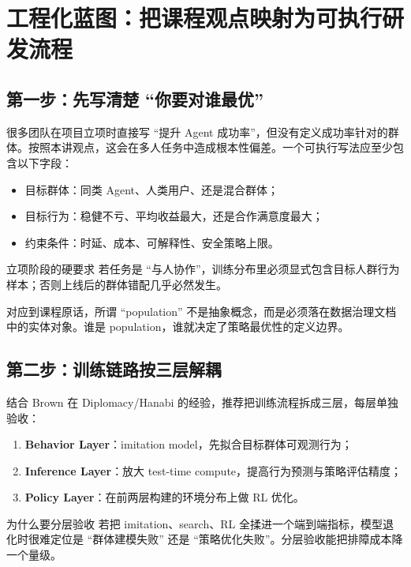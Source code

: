 \section{工程化蓝图：把课程观点映射为可执行研发流程}

\subsection{第一步：先写清楚 ``你要对谁最优''}
很多团队在项目立项时直接写 ``提升 Agent 成功率''，但没有定义成功率针对的群体。按照本讲观点，这会在多人任务中造成根本性偏差。一个可执行写法应至少包含以下字段：
\begin{itemize}
    \item 目标群体：同类 Agent、人类用户、还是混合群体；
    \item 目标行为：稳健不亏、平均收益最大，还是合作满意度最大；
    \item 约束条件：时延、成本、可解释性、安全策略上限。
\end{itemize}

\begin{importantbox}{立项阶段的硬要求}
若任务是 ``与人协作''，训练分布里必须显式包含目标人群行为样本；否则上线后的群体错配几乎必然发生。
\end{importantbox}

对应到课程原话，所谓 ``population'' 不是抽象概念，而是必须落在数据治理文档中的实体对象。谁是 population，谁就决定了策略最优性的定义边界。

\subsection{第二步：训练链路按三层解耦}
结合 Brown 在 Diplomacy/Hanabi 的经验，推荐把训练流程拆成三层，每层单独验收：
\begin{enumerate}
    \item \textbf{Behavior Layer}：imitation model，先拟合目标群体可观测行为；
    \item \textbf{Inference Layer}：放大 test-time compute，提高行为预测与策略评估精度；
    \item \textbf{Policy Layer}：在前两层构建的环境分布上做 RL 优化。
\end{enumerate}

\begin{knowledgebox}{为什么要分层验收}
若把 imitation、search、RL 全揉进一个端到端指标，模型退化时很难定位是 ``群体建模失败'' 还是 ``策略优化失败''。分层验收能把排障成本降一个量级。
\end{knowledgebox}

